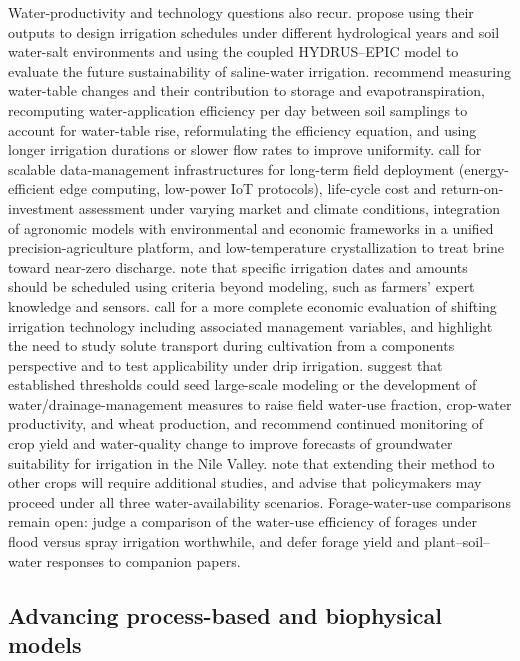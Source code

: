\documentclass[11pt]{article}
\begin{document}
Water-productivity and technology questions also recur. \textcite{Feng2019} propose using their outputs to design irrigation schedules under different hydrological years and soil water-salt environments and using the coupled HYDRUS--EPIC model to evaluate the future sustainability of saline-water irrigation. \textcite{Jia2017} recommend measuring water-table changes and their contribution to storage and evapotranspiration, recomputing water-application efficiency per day between soil samplings to account for water-table rise, reformulating the efficiency equation, and using longer irrigation durations or slower flow rates to improve uniformity. \textcite{Qin2025} call for scalable data-management infrastructures for long-term field deployment (energy-efficient edge computing, low-power IoT protocols), life-cycle cost and return-on-investment assessment under varying market and climate conditions, integration of agronomic models with environmental and economic frameworks in a unified precision-agriculture platform, and low-temperature crystallization to treat brine toward near-zero discharge. \textcite{Abdelkrim2021} note that specific irrigation dates and amounts should be scheduled using criteria beyond modeling, such as farmers' expert knowledge and sensors. \textcite{DINAR1989} call for a more complete economic evaluation of shifting irrigation technology including associated management variables, and \textcite{Qian2025} highlight the need to study solute transport during cultivation from a components perspective and to test applicability under drip irrigation. \textcite{ElHassanin2022} suggest that established thresholds could seed large-scale modeling or the development of water/drainage-management measures to raise field water-use fraction, crop-water productivity, and wheat production, and \textcite{RADSTAKE1988} recommend continued monitoring of crop yield and water-quality change to improve forecasts of groundwater suitability for irrigation in the Nile Valley. \textcite{Ayars2006} note that extending their method to other crops will require additional studies, and \textcite{Karegoudar2022} advise that policymakers may proceed under all three water-availability scenarios. Forage-water-use comparisons remain open: \textcite{Mundy2006} judge a comparison of the water-use efficiency of forages under flood versus spray irrigation worthwhile, and \textcite{Greenwood2006} defer forage yield and plant--soil--water responses to companion papers.

\subsection{Advancing process-based and biophysical models}
\end{document}

